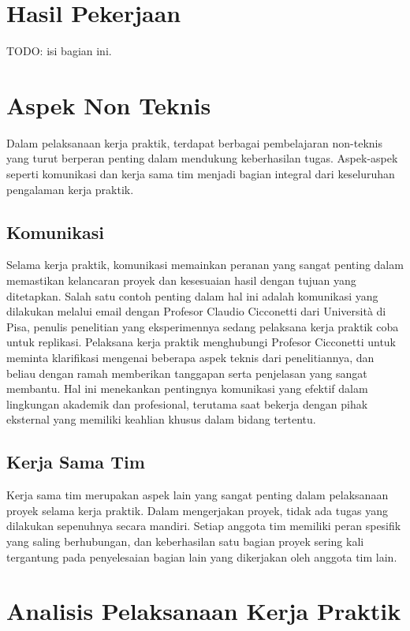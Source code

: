 \section{Hasil Pekerjaan}

TODO: isi bagian ini.

\section{Aspek Non Teknis}

Dalam pelaksanaan kerja praktik, terdapat berbagai pembelajaran non-teknis yang turut berperan penting dalam mendukung keberhasilan tugas. Aspek-aspek seperti komunikasi dan kerja sama tim menjadi bagian integral dari keseluruhan pengalaman kerja praktik.

\subsection{Komunikasi}

Selama kerja praktik, komunikasi memainkan peranan yang sangat penting dalam memastikan kelancaran proyek dan kesesuaian hasil dengan tujuan yang ditetapkan. Salah satu contoh penting dalam hal ini adalah komunikasi yang dilakukan melalui email dengan Profesor Claudio Cicconetti dari Università di Pisa, penulis penelitian yang eksperimennya sedang pelaksana kerja praktik coba untuk replikasi. Pelaksana kerja praktik menghubungi Profesor Cicconetti untuk meminta klarifikasi mengenai beberapa aspek teknis dari penelitiannya, dan beliau dengan ramah memberikan tanggapan serta penjelasan yang sangat membantu. Hal ini menekankan pentingnya komunikasi yang efektif dalam lingkungan akademik dan profesional, terutama saat bekerja dengan pihak eksternal yang memiliki keahlian khusus dalam bidang tertentu.

\subsection{Kerja Sama Tim}

Kerja sama tim merupakan aspek lain yang sangat penting dalam pelaksanaan proyek selama kerja praktik. Dalam mengerjakan proyek, tidak ada tugas yang dilakukan sepenuhnya secara mandiri. Setiap anggota tim memiliki peran spesifik yang saling berhubungan, dan keberhasilan satu bagian proyek sering kali tergantung pada penyelesaian bagian lain yang dikerjakan oleh anggota tim lain.

\section{Analisis Pelaksanaan Kerja Praktik}

